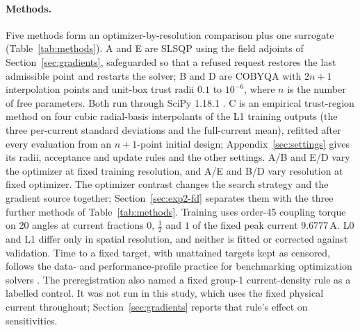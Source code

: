 \paragraph{Methods.}
Five methods form an optimizer-by-resolution comparison plus one
surrogate (Table~\ref{tab:methods}). A and E are SLSQP
\citep{kraft1988} using the field adjoints of Section~\ref{sec:gradients},
safeguarded so that a refused request restores the last admissible point
and restarts the solver; B and D are COBYQA \citep{ragonneau2022} with $2n+1$ interpolation points
and unit-box trust radii $0.1$ to $10^{-6}$, where $n$ is the number of free
parameters. Both run through SciPy 1.18.1 \citep{virtanen2020scipy}. C is
an empirical trust-region method on four cubic radial-basis interpolants
of the L1 training outputs (the three per-current standard deviations and
the full-current mean), refitted after every evaluation from an $n+1$-point
initial design; Appendix~\ref{sec:settings} gives its radii, acceptance
and update rules and the other settings. A/B and E/D vary the optimizer at fixed training resolution,
and A/E and B/D vary resolution at fixed optimizer. The optimizer contrast
changes the search strategy and the gradient source together;
Section~\ref{sec:exp2-fd} separates them with the three further methods of
Table~\ref{tab:methods}. Training uses order-45 coupling torque
on 20 angles at current fractions $0$, $\tfrac12$ and $1$ of the fixed peak
current $9.6777\,\mathrm{A}$. L0 and L1 differ only in spatial resolution,
and neither is fitted or corrected against validation. Time to a fixed
target, with unattained targets kept as censored, follows the data- and performance-profile
practice for benchmarking optimization solvers \citep{more2009benchmarking,dolan2002benchmarking}.
The preregistration also named a fixed group-1 current-density rule as a
labelled control. It was not run in this study, which uses the fixed
physical current throughout; Section~\ref{sec:gradients} reports that
rule's effect on sensitivities.

